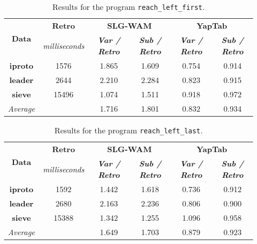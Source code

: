 \begin{table}[ht]
\centering
\footnotesize{
  \begin{tabular}{c|c|cc|cc}
   \hline
    \hline
    \multicolumn{1}{c|}{\multirow{2}{*}{\small{\textbf{Data}}}} & \textbf{\small{Retro}} & \multicolumn{2}{c|}{\small{\textbf{SLG-WAM}}} & \multicolumn{2}{c}{\small{\textbf{YapTab}}} \\
     \multicolumn{1}{c|}{} & \scriptsize{\textit{milliseconds}} & \textbf{\textit{\scriptsize{Var / Retro}}} & \textbf{\textit{\scriptsize{Sub / Retro}}} & \textbf{\textit{\scriptsize{Var / Retro}}} & \textbf{\textit{\scriptsize{Sub / Retro}}} \\
   \hline
   \hline

\multirow{1}{*}{\textbf{iproto}} &  1576 &  1.865  &  1.609  &  0.754 & 0.914 \\
\hline
\multirow{1}{*}{\textbf{leader}} &  2644 &  2.210  &  2.284  &  0.823 & 0.915 \\
\hline
\multirow{1}{*}{\textbf{sieve}} &  15496 &  1.074  &  1.511  &  0.918 & 0.972 \\
\hline
\hline
\multicolumn{1}{c}{\textit{Average}} & & 1.716 & 1.801 & 0.832 & 0.934 \\ 
\hline
\hline
\end{tabular}
}
\caption{Results for the program \texttt{reach\_left\_first}.}
\label{tbl:prefix_reach_left_first}
\end{table}

\begin{table}[ht]
\centering
\footnotesize{
  \begin{tabular}{c|c|cc|cc}
   \hline
    \hline
    \multicolumn{1}{c|}{\multirow{2}{*}{\small{\textbf{Data}}}} & \textbf{\small{Retro}} & \multicolumn{2}{c|}{\small{\textbf{SLG-WAM}}} & \multicolumn{2}{c}{\small{\textbf{YapTab}}} \\
     \multicolumn{1}{c|}{} & \scriptsize{\textit{milliseconds}} & \textbf{\textit{\scriptsize{Var / Retro}}} & \textbf{\textit{\scriptsize{Sub / Retro}}} & \textbf{\textit{\scriptsize{Var / Retro}}} & \textbf{\textit{\scriptsize{Sub / Retro}}} \\
   \hline
   \hline

\multirow{1}{*}{\textbf{iproto}} &  1592 &  1.442  &  1.618  &  0.736 & 0.912 \\
\hline
\multirow{1}{*}{\textbf{leader}} &  2680 &  2.163  &  2.236  &  0.806 & 0.900 \\
\hline
\multirow{1}{*}{\textbf{sieve}} &  15388 &  1.342  &  1.255  &  1.096 & 0.958 \\
\hline
\hline
\multicolumn{1}{c}{\textit{Average}} & & 1.649 & 1.703 & 0.879 & 0.923 \\ 
\hline
\hline
\end{tabular}
}
\caption{Results for the program \texttt{reach\_left\_last}.}
\label{tbl:prefix_reach_left_last}
\end{table}


